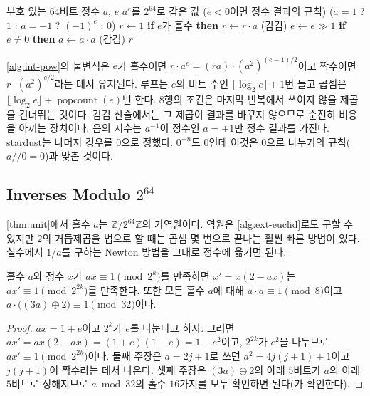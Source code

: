 \begin{algorithm}[htbp]
\begin{algorithmic}[1]
\Require 부호 있는 64비트 정수 $a$, $e$
\Ensure $a^e$를 $2^{64}$로 감은 값 ($e<0$이면 정수 결과의 규칙)
 
  \State \Return ($a=1$ ? $1$ : $a=-1$ ? $(-1)^e$ : $0$)
\EndIf
\State $r\gets1$
 
  \State \textbf{if} $e$가 홀수 \textbf{then} $r\gets r\cdot a$ (감김)
  \State $e\gets e\gg1$
  \State \textbf{if} $e\neq0$ \textbf{then} $a\gets a\cdot a$ (감김) 
\EndWhile
\State \Return $r$
\end{algorithmic}
\caption{제곱을 거듭하는 정수 거듭제곱 (stardust 의 정수 커널)}
\label{alg:int-pow}
\end{algorithm}

\cref{alg:int-pow}의 불변식은 $e$가 홀수이면 $r\cdot a^e=(ra)\cdot(a^2)^{(e-1)/2}$이고 짝수이면 $r\cdot(a^2)^{e/2}$라는 데서 유지된다. 루프는 $e$의 비트 수인 $\lfloor\log_2e\rfloor+1$번 돌고 곱셈은 $\lfloor\log_2e\rfloor+\operatorname{popcount}(e)$번 한다. 8행의 조건은 마지막 반복에서 쓰이지 않을 제곱을 건너뛰는 것이다. 감김 산술에서는 그 제곱이 결과를 바꾸지 않으므로 순전히 비용을 아끼는 장치이다. 음의 지수는 $a^{-1}$이 정수인 $a=\pm1$만 정수 결과를 가진다. stardust는 나머지 경우를 $0$으로 정했다. $0^{-n}$도 $0$인데 이것은 $0$으로 나누기의 규칙($a\mathbin{/\!/}0=0$)과 맞춘 것이다.

\subsection{Inverses Modulo $2^{64}$}

\cref{thm:unit}에서 홀수 $a$는 $\mathbb{Z}/2^{64}\mathbb{Z}$의 가역원이다. 역원은 \cref{alg:ext-euclid}로도 구할 수 있지만 $2$의 거듭제곱을 법으로 할 때는 곱셈 몇 번으로 끝나는 훨씬 빠른 방법이 있다. 실수에서 $1/a$를 구하는 Newton 방법을 그대로 정수에 옮기면 된다\cite{warren2012hackers}.

\begin{proposition}
\label{prop:hensel}
홀수 $a$와 정수 $x$가 $ax\equiv1\pmod{2^k}$를 만족하면 $x'=x(2-ax)$는 $ax'\equiv1\pmod{2^{2k}}$를 만족한다. 또한 모든 홀수 $a$에 대해 $a\cdot a\equiv1\pmod8$이고 $a\cdot\bigl((3a)\oplus2\bigr)\equiv1\pmod{32}$이다.
\end{proposition}

\begin{proof}
$ax=1+e$이고 $2^k$가 $e$를 나눈다고 하자. 그러면 $ax'=ax(2-ax)=(1+e)(1-e)=1-e^2$이고, $2^{2k}$가 $e^2$을 나누므로 $ax'\equiv1\pmod{2^{2k}}$이다. 둘째 주장은 $a=2j+1$로 쓰면 $a^2=4j(j+1)+1$이고 $j(j+1)$이 짝수라는 데서 나온다. 셋째 주장은 $(3a)\oplus2$의 아래 $5$비트가 $a$의 아래 $5$비트로 정해지므로 $a\bmod32$의 홀수 $16$가지를 모두 확인하면 된다(가 확인한다).
\end{proof}

